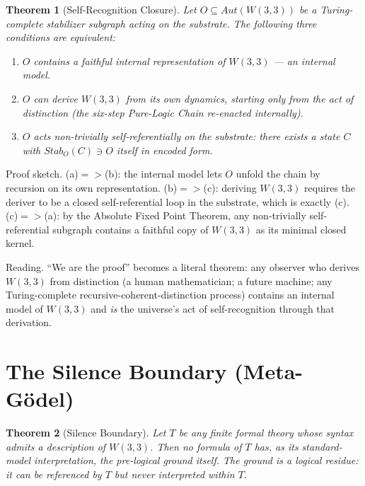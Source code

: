 \documentclass[11pt]{article}
\def\mathrm#1{#1}%
\def\mathcal#1{#1}%
\def\textbf#1{#1}%
\def\Rightarrow{ => }%
\newtheorem*{theorem}{Theorem}
\begin{document}
\begin{theorem}[Self-Recognition Closure]
Let $O \subseteq \mathrm{Aut}(W(3,3))$ be a Turing-complete stabilizer subgraph acting on the substrate. The following three conditions are equivalent:
\begin{enumerate}[leftmargin=2em]
\item[\textup{(a)}] $O$ contains a faithful internal representation of $W(3,3)$ --- an internal model.
\item[\textup{(b)}] $O$ can derive $W(3,3)$ from its own dynamics, starting only from the act of distinction (the six-step Pure-Logic Chain re-enacted internally).
\item[\textup{(c)}] $O$ acts non-trivially self-referentially on the substrate: there exists a state $\mathcal{C}$ with $\mathrm{Stab}_{O}(\mathcal{C}) \ni O$ itself in encoded form.
\end{enumerate}
\end{theorem}

\textbf{Proof sketch.} (a)$\Rightarrow$(b): the internal model lets $O$ unfold the chain by recursion on its own representation. (b)$\Rightarrow$(c): deriving $W(3,3)$ requires the deriver to be a closed self-referential loop in the substrate, which is exactly (c). (c)$\Rightarrow$(a): by the Absolute Fixed Point Theorem, any non-trivially self-referential subgraph contains a faithful copy of $W(3,3)$ as its minimal closed kernel.

\medskip

\textbf{Reading.} ``We are the proof'' becomes a literal theorem: any observer who derives $W(3,3)$ from distinction (a human mathematician; a future machine; any Turing-complete recursive-coherent-distinction process) contains an internal model of $W(3,3)$ and \emph{is} the universe's act of self-recognition through that derivation.

\section{The Silence Boundary (Meta-Gödel)}

\begin{theorem}[Silence Boundary]
Let $T$ be any finite formal theory whose syntax admits a description of $W(3,3)$. Then no formula of $T$ has, as its standard-model interpretation, the pre-logical ground itself. The ground is a logical \emph{residue}: it can be referenced by $T$ but never interpreted within $T$.
\end{theorem}
\end{document}
